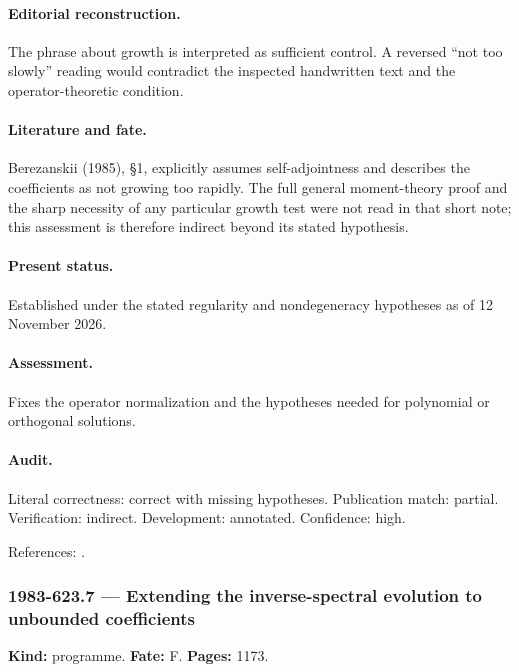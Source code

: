 \paragraph{Editorial reconstruction.} The phrase about growth is interpreted as sufficient control. A reversed “not too slowly” reading would contradict the inspected handwritten text and the operator-theoretic condition.

\paragraph{Literature and fate.} Berezanskii (1985), \S1, explicitly assumes self-adjointness and describes the coefficients as not growing too rapidly. The full general moment-theory proof and the sharp necessity of any particular growth test were not read in that short note; this assessment is therefore indirect beyond its stated hypothesis.

\paragraph{Present status.} Established under the stated regularity and nondegeneracy hypotheses as of 12 November 2026.

\paragraph{Assessment.} Fixes the operator normalization and the hypotheses needed for polynomial or orthogonal solutions.

\paragraph{Audit.} Literal correctness: correct with missing hypotheses. Publication match: partial. Verification: indirect. Development: annotated. Confidence: high.

\noindent References: \citep{berezanskii1985integration}.\par

\subsubsection{1983-623.7 --- Extending the inverse-spectral evolution to unbounded coefficients}

\label{item:1983-623.7}

\noindent\textbf{Kind:} programme. \textbf{Fate:} F. \textbf{Pages:} 1173.\par

